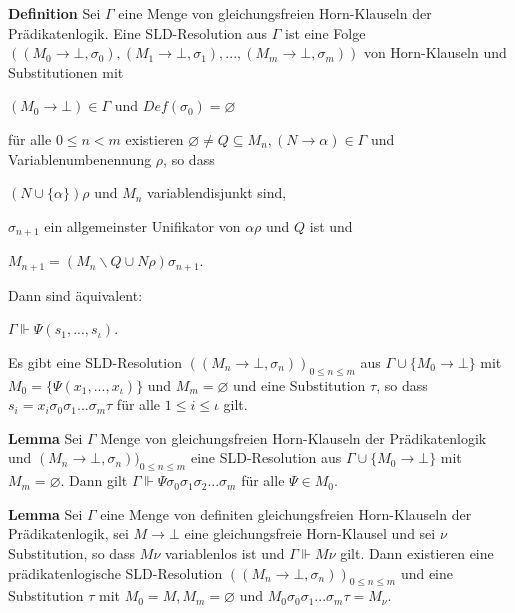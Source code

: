 \documentclass[a4paper]{article}
\renewcommand{\note}[2]{\begin{noteBox} \textbf{#1} #2 \end{noteBox}}
\begin{document}
\begin{multicols}{3}
  \note{Definition}{Sei $\Gamma$ eine Menge von gleichungsfreien Horn-Klauseln der Prädikatenlogik. Eine SLD-Resolution aus $\Gamma$ ist eine Folge $((M_0\rightarrow\bot,\sigma_0),(M_1\rightarrow\bot,\sigma_1),...,(M_m\rightarrow\bot,\sigma_m))$ von Horn-Klauseln und Substitutionen mit
    \begin{itemize*}
      \item $(M_0\rightarrow\bot)\in\Gamma$ und $Def(\sigma_0)=\varnothing$
      \item für alle $0\leq n<m$ existieren $\varnothing\not=Q\subseteq M_n,(N\rightarrow\alpha)\in\Gamma$ und Variablenumbenennung $\rho$, so dass
      \begin{itemize*}
        \item $(N\cup\{\alpha\})\rho$ und $M_n$ variablendisjunkt sind,
        \item $\sigma_{n+1}$ ein allgemeinster Unifikator von $\alpha\rho$ und $Q$ ist und
        \item $M_{n+1} = (M_n\backslash Q\cup N\rho)\sigma_{n+1}$.
      \end{itemize*}
    \end{itemize*}
  }

  Dann sind äquivalent:
  \begin{enumerate*}
    \item $\Gamma\Vdash\Psi(s_1,...,s_{\iota})$.
    \item Es gibt eine SLD-Resolution $((M_n\rightarrow\bot,\sigma_n))_{0\leq n\leq m}$ aus $\Gamma\cup\{M_0\rightarrow\bot\}$ mit $M_0=\{\Psi(x_1,...,x_{\iota})\}$ und $M_m=\varnothing$ und eine Substitution $\tau$, so dass $s_i=x_i\sigma_0 \sigma_1 ...\sigma_m\tau$ für alle $1\leq i\leq \iota$ gilt.
  \end{enumerate*}

  \note{Lemma}{Sei $\Gamma$ Menge von gleichungsfreien Horn-Klauseln der Prädikatenlogik und $(M_n \rightarrow\bot,\sigma_n))_{0\leq n\leq m}$ eine SLD-Resolution aus $\Gamma\cup\{M_0\rightarrow\bot\}$ mit $M_m=\varnothing$.
    Dann gilt $\Gamma\Vdash\Psi\sigma_0 \sigma_1\sigma_2...\sigma_m$ für alle $\Psi\in M_0$.}

  \note{Lemma}{Sei $\Gamma$ eine Menge von definiten gleichungsfreien Horn-Klauseln der Prädikatenlogik, sei $M\rightarrow\bot$ eine gleichungsfreie Horn-Klausel und sei $\nu$ Substitution, so dass $M\nu$ variablenlos ist und $\Gamma\Vdash M\nu$ gilt. Dann existieren eine prädikatenlogische SLD-Resolution $((M_n \rightarrow\bot,\sigma_n))_{0 \leq n\leq m}$ und eine Substitution $\tau$ mit $M_0=M,M_m=\varnothing$ und $M_0 \sigma_0 \sigma_1... \sigma_m \tau=M_{\nu}$.}


\end{multicols}
\end{document}
